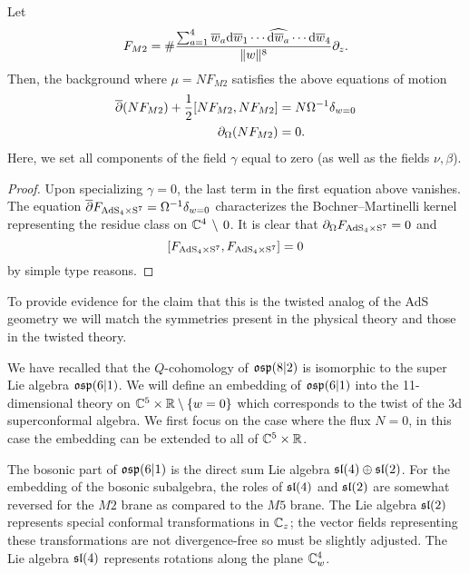 \begin{lem}
Let
\[
 F_{M2} = \# \frac{\sum_{a=1}^4 \wbar_a \d \wbar_1 \cdots \Hat{\d \wbar_a} \cdots \d \wbar_4}{\|w\|^{8}} \partial_z .
\]
Then, the background where $\mu = N F_{M2}$ 
satisfies the above equations of motion
\begin{align*}
\dbar (N F_{M2}) + \frac12 [N F_{M2}, N F_{M2}] & = N \Omega^{-1} \delta_{w=0} \\
\div (N F_{M2}) & = 0  .
\end{align*}
Here, we set all components of the field $\gamma$ equal to zero (as well as the fields $\nu,\beta$). 
\end{lem}

\begin{proof}
Upon specializing $\gamma = 0$, the last term in the first equation above vanishes. The equation $\dbar F_{\rm{AdS}_4 \times S^7} = \Omega^{-1} \delta_{w=0}$ characterizes the Bochner--Martinelli kernel representing the residue class on $\CC^4 \, \setminus \, 0$. 
It is clear that $\div F_{\rm{AdS}_4 \times S^7} = 0$ and 
\[
[F_{\rm{AdS}_4 \times S^7}, F_{\rm{AdS}_4 \times S^7}] = 0
\] 
by simple type reasons. 
\end{proof}

\parsec[]

To provide evidence for the claim that this is the twisted analog of the AdS geometry we will match the symmetries present in the physical theory and those in the twisted theory. 

We have recalled that the $Q$-cohomology of $\lie{osp}(8|2)$ is isomorphic to the super Lie algebra $\lie{osp}(6|1)$. 
We will define an embedding of $\lie{osp}(6|1)$ into the 11-dimensional theory on $\CC^5 \times \RR \setminus \{w=0\}$ which corresponds to the twist of the 3d superconformal algebra.
We first focus on the case where the flux $N=0$, in this case the embedding can be extended to all of $\CC^5 \times \RR$. 

\parsec[] 

The bosonic part of $\lie{osp}(6|1)$ is the direct sum Lie algebra $\lie{sl}(4) \oplus \lie{sl}(2)$. 
For the embedding of the bosonic subalgebra, the roles of $\lie{sl}(4)$ and $\lie{sl}(2)$ are somewhat reversed for the $M2$ brane as compared to the $M5$ brane. 
The Lie algebra $\lie{sl}(2)$ represents special conformal transformations in $\CC_z$; the vector fields representing these transformations are not divergence-free so must be slightly adjusted. 
The Lie algebra $\lie{sl}(4)$ represents rotations along the plane $\CC^4_w$.   

